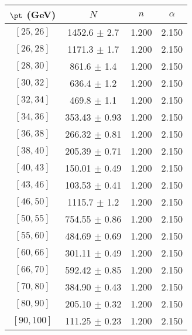 \begin{tabular}{c||c|c|c}
$\pt$ (GeV) & $N$ & $n$ & $\alpha$ \\
\hline
$[25, 26]$ & 1452.6 $\pm$ 2.7 & 1.200 & 2.150\\
$[26, 28]$ & 1171.3 $\pm$ 1.7 & 1.200 & 2.150\\
$[28, 30]$ & 861.6 $\pm$ 1.4 & 1.200 & 2.150\\
$[30, 32]$ & 636.4 $\pm$ 1.2 & 1.200 & 2.150\\
$[32, 34]$ & 469.8 $\pm$ 1.1 & 1.200 & 2.150\\
$[34, 36]$ & 353.43 $\pm$ 0.93 & 1.200 & 2.150\\
$[36, 38]$ & 266.32 $\pm$ 0.81 & 1.200 & 2.150\\
$[38, 40]$ & 205.39 $\pm$ 0.71 & 1.200 & 2.150\\
$[40, 43]$ & 150.01 $\pm$ 0.49 & 1.200 & 2.150\\
$[43, 46]$ & 103.53 $\pm$ 0.41 & 1.200 & 2.150\\
$[46, 50]$ & 1115.7 $\pm$ 1.2 & 1.200 & 2.150\\
$[50, 55]$ & 754.55 $\pm$ 0.86 & 1.200 & 2.150\\
$[55, 60]$ & 484.69 $\pm$ 0.69 & 1.200 & 2.150\\
$[60, 66]$ & 301.11 $\pm$ 0.49 & 1.200 & 2.150\\
$[66, 70]$ & 592.42 $\pm$ 0.85 & 1.200 & 2.150\\
$[70, 80]$ & 384.90 $\pm$ 0.43 & 1.200 & 2.150\\
$[80, 90]$ & 205.10 $\pm$ 0.32 & 1.200 & 2.150\\
$[90, 100]$ & 111.25 $\pm$ 0.23 & 1.200 & 2.150\\
\end{tabular}
